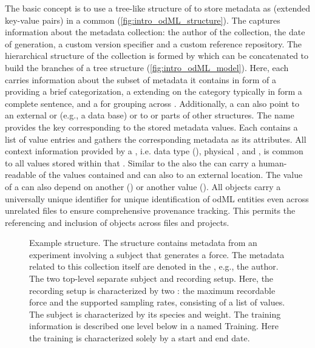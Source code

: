 The basic concept is to use a tree-like structure of  to store metadata as  (extended key-value pairs) in a common  (\cref{fig:intro_odML_structure}). The  captures information about the metadata collection: the author of the collection, the date of generation, a custom version specifier and a custom reference repository. The hierarchical structure of the collection is formed by  which can be concatenated to build the branches of a tree structure (\cref{fig:intro_odML_model}). Here, each  carries information about the subset of metadata it contains in form of a   providing a brief categorization, a  extending on the category typically in form a complete sentence, and a  for grouping across . Additionally, a  can also point to an external  or  (e.g., a data base) or  to or  parts of other  structures. The  name provides the key corresponding to the stored metadata values. Each  contains a list of value entries and gathers the corresponding metadata as its  attributes. 
All context information provided by a , i.e. data type (), physical ,  and , is common to all values stored within that .  Similar to the  also the  can carry a human-readable  of the values contained and can also  to an external location. The value of a  can also depend on another  () or another  value (). All  objects carry a universally unique identifier for unique identification of odML entities even across unrelated files to ensure comprehensive provenance tracking. This permits the referencing and inclusion of  objects across files and projects.\\



\begin{figure}[hp]
 \centering
 \scalebox{0.45}{
 }
 \caption[Example  structure]{Example  structure. The  structure contains metadata from an experiment involving a subject that generates a force. The metadata related to this collection itself are denoted in the  , e.g., the author. The two top-level  separate subject and recording setup. Here, the recording setup is characterized by two : the maximum recordable force and the supported sampling rates, consisting of a list of values. The subject is characterized by its species and weight. The training information is described one level below in a  named Training. Here the training is characterized solely by a start and end date.}
 \label{fig:intro_example_odml_structure}
\end{figure}


